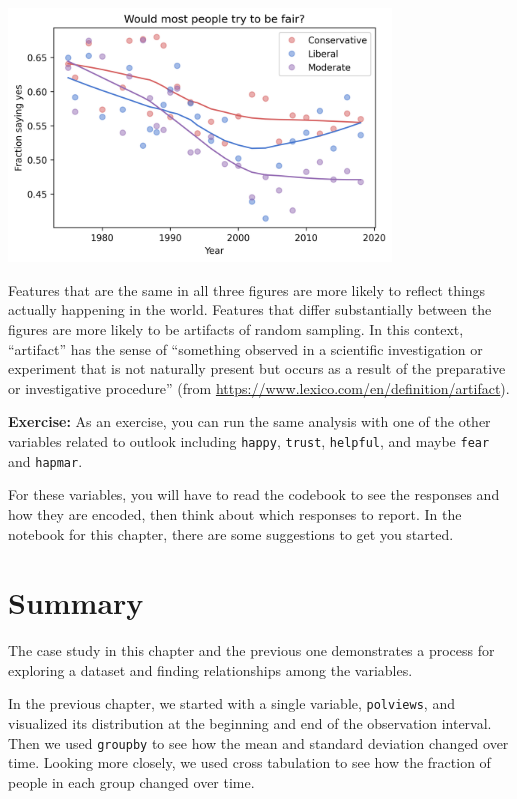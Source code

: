 \begin{center}
\includegraphics[width=4in]{chapters/03_outlook_files/03_outlook_59_2.png}
\end{center}

Features that are the same in all three figures are more likely to
reflect things actually happening in the world. Features that differ
substantially between the figures are more likely to be artifacts of
random sampling. In this context, ``artifact'' has the sense of
``something observed in a scientific investigation or experiment that is
not naturally present but occurs as a result of the preparative or
investigative procedure'' (from
\url{https://www.lexico.com/en/definition/artifact}).

\textbf{Exercise:} As an exercise, you can run the same analysis with
one of the other variables related to outlook including
\passthrough{\lstinline!happy!}, \passthrough{\lstinline!trust!},
\passthrough{\lstinline!helpful!}, and maybe
\passthrough{\lstinline!fear!} and \passthrough{\lstinline!hapmar!}.

For these variables, you will have to read the codebook to see the
responses and how they are encoded, then think about which responses to
report. In the notebook for this chapter, there are some suggestions to
get you started.

\hypertarget{summary}{%
\section{Summary}\label{summary}}

The case study in this chapter and the previous one demonstrates a
process for exploring a dataset and finding relationships among the
variables.

In the previous chapter, we started with a single variable,
\passthrough{\lstinline!polviews!}, and visualized its distribution at
the beginning and end of the observation interval. Then we used
\passthrough{\lstinline!groupby!} to see how the mean and standard
deviation changed over time. Looking more closely, we used cross
tabulation to see how the fraction of people in each group changed over
time.

